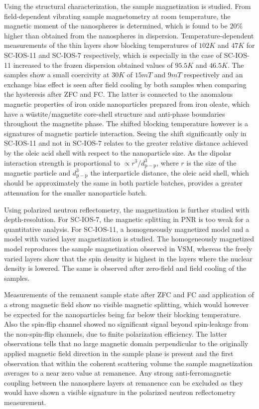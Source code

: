 \documentclass[\main/dresen_thesis.tex]{subfiles}
\begin{document}
  Using the structural characterization, the sample magnetization is studied.
  From field-dependent vibrating sample magnetometry at room temperature, the magnetic moment of the nanospheres is determined, which is found to be $20 \%$ higher than obtained from the nanospheres in dispersion.
  Temperature-dependent measurements of the thin layers show blocking temperatures of $102 \unit{K}$ and $47 \unit{K}$ for SC-IOS-11 and SC-IOS-7 respectively, which is especially in the case of SC-IOS-11 increased to the frozen dispersion obtained values of $95.5 \unit{K}$ and $46.5 \unit{K}$.
  The samples show a small coercivity at $30 \unit{K}$ of $15 \unit{mT}$ and $9 \unit{mT}$ respectively and an exchange bias effect is seen after field cooling by both samples when comparing the hysteresis after ZFC and FC.
  The latter is connected to the anomalous magnetic properties of iron oxide nanoparticles prepared from iron oleate, which have a w\"ustite/magnetite core-shell structure and anti-phase boundaries throughout the magnetite phase.
  The shifted blocking temperature however is a signatures of magnetic particle interaction.
  Seeing the shift significantly only in SC-IOS-11 and not in SC-IOS-7 relates to the greater relative distance achieved by the oleic acid shell with respect to the nanoparticle size.
  As the dipolar interaction strength is proportional to $\propto r^3 / d_\mathrm{p-p}^3$, where $r$ is the size of the magnetic particle and $d_\mathrm{p-p}^3$ the interparticle distance, the oleic acid shell, which should be approximately the same in both particle batches, provides a greater attenuation for the smaller nanoparticle batch.

  Using polarized neutron reflectometry, the magnetization is further studied with depth-resolution.
  For SC-IOS-7, the magnetic splitting in PNR is too weak for a quantitative analysis.
  For SC-IOS-11, a homogeneously magnetized model and a model with varied layer magnetization is studied.
  The homogeneously magnetized model reproduces the sample magnetization observed in VSM, whereas the freely varied layers show that the spin density is highest in the layers where the nuclear density is lowered.
  The same is observed after zero-field and field cooling of the samples.

  Measurements of the remanent sample state after ZFC and FC and application of a strong magnetic field show no visible magnetic splitting, which would however be expected for the nanoparticles being far below their blocking temperature.
  Also the spin-flip channel showed no significant signal beyond spin-leakage from the non-spin-flip channels, due to finite polarization efficiency.
  The latter observations tells that no large magnetic domain perpendicular to the originally applied magnetic field direction in the sample plane is present and the first observation that within the coherent scattering volume the sample magnetization averages to a near zero value at remanence.
  Any strong anti-ferromagnetic coupling between the nanosphere layers at remanence can be excluded as they would have shown a visible signature in the polarized neutron reflectometry measurement.
\end{document}
